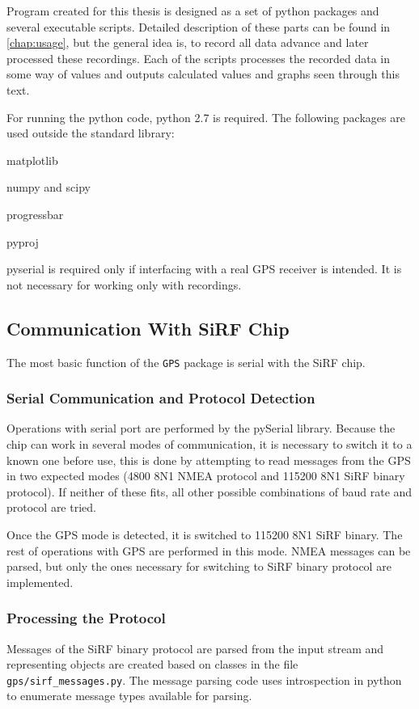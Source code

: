 Program created for this thesis is designed as a set of python packages and
several executable scripts.
Detailed description of these parts can be found in \cref{chap:usage},
but the general idea is, to record all data advance and later processed these
recordings.
Each of the scripts processes the recorded data in some way of values and
outputs calculated values and graphs seen through this text.

For running the python code, python 2.7 is required.
The following packages are used outside the standard library:
\begin{compactitem}
\item matplotlib
\item numpy and scipy
\item progressbar
\item pyproj
\item pyserial is required only if interfacing with a real
    GPS receiver is intended. It is not necessary for working only with recordings.
\end{compactitem}

\subsection{Communication With SiRF Chip}
The most basic function of the \verb=GPS= package is serial with the
SiRF chip.

\subsubsection{Serial Communication and Protocol Detection}
Operations with serial port are performed by the pySerial library.
Because the chip can work in several modes of communication, it is necessary to
switch it to a known one before use, this is done by attempting to read messages
from the GPS in two expected modes (4800 8N1 NMEA protocol and 115200 8N1 SiRF
binary protocol). If neither of these fits, all other possible
combinations of baud rate and protocol are tried.

Once the GPS mode is detected, it is switched to 115200 8N1 SiRF binary.
The rest of operations with GPS are performed in this mode.
NMEA messages can be parsed, but only the ones necessary for switching to
SiRF binary protocol are implemented.

\subsubsection{Processing the Protocol}
Messages of the SiRF binary protocol are parsed from the input stream and
representing objects are created based on classes in the file \verb=gps/sirf_messages.py=.
The message parsing code uses introspection in python to enumerate message types
available for parsing.

